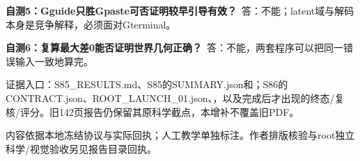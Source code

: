 \documentclass[UTF8,11pt,a4paper]{ctexart}
\begin{document}
\noindent\textbf{自测5：Gguide只胜Gpaste可否证明较早引导有效？}\ 答：不能；latent域与解码本身是竞争解释，必须面对Gterminal。
\par


\noindent\textbf{自测6：复算最大差0能否证明世界几何正确？}\ 答：不能，两套程序可以把同一错误输入一致地算完。
\par


证据入口：S85\_RESULTS.md、S85的SUMMARY.json和；S86的CONTRACT.json、ROOT\_LAUNCH\_01.json、，以及完成后才出现的终态/复核/评分。旧142页报告仍保留其原科学截点，本增补不覆盖旧PDF。
\par


\vfill\noindent\small\textcolor{accent}{内容依据本地冻结协议与实际回执；人工教学单独标注。作者排版核验与root独立科学/视觉验收另见报告目录回执。}
\end{document}
